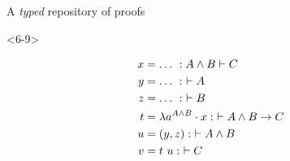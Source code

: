\documentclass[ignorenonframetext,red]{beamer}
\newcommand\postbinder{\cdot}
\newcommand\app[1]{{#1}\ }
\newcommand\tlam[2]{\ensuremath\lambda{#1}^{#2}\postbinder}
\newcommand\lam{\tlam}
\begin{document}
\begin{frame}[fragile]{A \emph{typed} repository of proofs}
\begin{onlyenv}
\begin{center}
    \end{center}
  \end{onlyenv}
  \begin{onlyenv}<6-9>
    \small
    \begin{overlayarea}{0pt}{\textheight}
      \begin{align*}
        x &= \ldots\ : A\wedge B\vdash C \\
        y &= \ldots\ :\ \vdash A \\
        z &= \ldots\ :\ \vdash B \\
        t &= \lam a {A\wedge B} x :\ \vdash A\wedge B\to C \\
        u &= (y, z) :\ \vdash A\wedge B \\
        v &= \app t u :\ \vdash C \\

\end{align*}
\end{overlayarea}
\end{onlyenv}
\end{frame}
\end{document}
